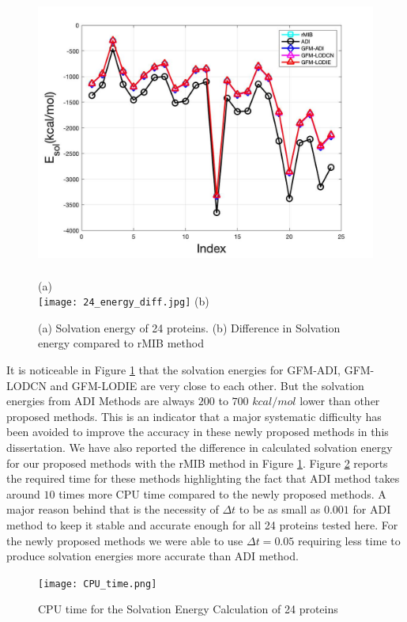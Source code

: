\begin{figure}[H]
	\begin{center}		
	\includegraphics[width=\textwidth,height=270pt]{24_energy.jpg}\\
	(a)\\
\texttt{[image: 24\_energy\_diff.jpg]}
	(b)\\ 
	\end{center}
\caption{(a) Solvation energy of 24 proteins. (b) Difference in Solvation energy compared to rMIB method}
\label{fig:24protein}
\end{figure}
It is noticeable in Figure \ref{fig:24protein} that the solvation energies for GFM-ADI, GFM-LODCN and GFM-LODIE are very close to each other. But the solvation energies from ADI Methods are always $200$ to $700$ $kcal/mol$ lower than other proposed methods. This is an indicator that a major systematic difficulty has been avoided to improve the accuracy in these newly proposed methods in this dissertation. We have also reported the difference in calculated solvation energy for our proposed methods with the rMIB method in Figure \ref{fig:24protein}. Figure \ref{fig:CPU_24protein} reports the required time for these methods highlighting the fact that ADI method takes around $10$ times more CPU time compared to the newly proposed methods. A major reason behind that is the necessity of $\Delta t$ to be as small as $0.001$ for ADI method to keep it stable and accurate enough for all 24 proteins tested here. For the newly proposed methods we were able to use $\Delta t =0.05$ requiring less time to produce solvation energies more accurate than ADI method.    
\begin{figure}[h]
	\begin{center}
		\texttt{[image: CPU\_time.png]}
	\end{center}
	\caption{CPU time for the Solvation Energy Calculation of 24 proteins}
	\label{fig:CPU_24protein}
\end{figure}
